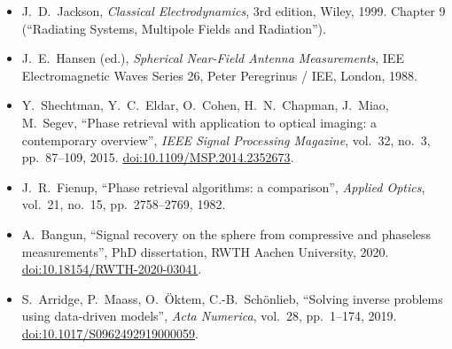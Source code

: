\documentclass[11pt,a4paper]{report}
\begin{document}
\begin{itemize}
\item J.~D.~Jackson, \emph{Classical Electrodynamics}, 3rd edition, Wiley, 1999.
Chapter 9 (\enquote{Radiating Systems, Multipole Fields and Radiation}).
\item J.~E.~Hansen (ed.), \emph{Spherical Near-Field Antenna Measurements}, IEE
Electromagnetic Waves Series 26, Peter Peregrinus / IEE, London, 1988.
\item Y.~Shechtman, Y.~C.~Eldar, O.~Cohen, H.~N.~Chapman, J.~Miao, M.~Segev,
\enquote{Phase retrieval with application to optical imaging: a contemporary
overview}, \emph{IEEE Signal Processing Magazine}, vol.~32, no.~3, pp.~87--109, 2015.
\href{https://doi.org/10.1109/MSP.2014.2352673}{doi:10.1109/MSP.2014.2352673}.
\item J.~R.~Fienup, \enquote{Phase retrieval algorithms: a comparison},
\emph{Applied Optics}, vol.~21, no.~15, pp.~2758--2769, 1982.
\item A.~Bangun, \enquote{Signal recovery on the sphere from compressive and
phaseless measurements}, PhD dissertation, RWTH Aachen University, 2020.
\href{https://doi.org/10.18154/RWTH-2020-03041}{doi:10.18154/RWTH-2020-03041}.
\item S.~Arridge, P.~Maass, O.~\"Oktem, C.-B.~Sch\"onlieb, \enquote{Solving inverse
problems using data-driven models}, \emph{Acta Numerica}, vol.~28, pp.~1--174, 2019.
\href{https://doi.org/10.1017/S0962492919000059}{doi:10.1017/S0962492919000059}.
\end{itemize}

\end{document}
